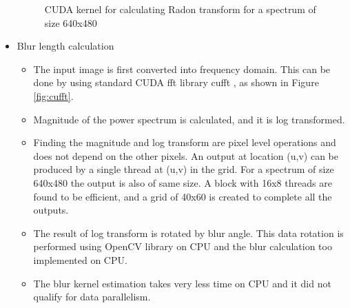 \begin{itemize}
\begin{figure}[h!]
	\caption{CUDA kernel for calculating Radon transform for a spectrum of size 640x480}
	\label{fig:radon threadaccess}
\end{figure}
\item Blur length calculation
\begin{itemize}
	\item The input image is first converted into frequency domain. This can be done by using standard CUDA fft library cufft , as shown in Figure \ref{fig:cufft}. 
	\item Magnitude of the power spectrum is calculated, and it is log transformed. 
	\item Finding the magnitude and log transform are pixel level operations and does not depend on the other pixels. An output at location (u,v) can be produced by a single thread at (u,v) in the grid. For a spectrum of size 640x480 the output is also of same size. A block with 16x8 threads are found to be efficient, and a grid of 40x60 is created to complete all the outputs.
	\item The result of log transform is rotated by blur angle. This data rotation is performed using OpenCV library on CPU and the blur calculation too implemented on CPU.
	\item The blur kernel estimation takes very less time on CPU and it did not qualify for data parallelism.
\end{itemize}
\end{itemize} 

